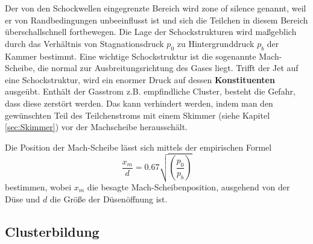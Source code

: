 % 
Der von den Schockwellen eingegrenzte Bereich wird zone of silence genannt, weil er von Randbedingungen unbeeinflusst ist und sich die Teilchen in diesem Bereich überschallschnell fortbewegen.
Die Lage der Schockstrukturen wird maßgeblich durch das Verhältnis von Stagnationsdruck $p_0$ zu Hintergrunddruck $p_b$ der Kammer bestimmt. Eine wichtige Schockstruktur ist die sogenannte Mach-Scheibe, die normal zur Ausbreitungsrichtung des Gases liegt. Trifft der Jet auf eine Schockstruktur, wird ein enormer Druck auf dessen \textbf{Konstituenten} ausgeübt. Enthält der Gasstrom z.B. empfindliche Cluster, besteht die Gefahr, dass diese zerstört werden. Das kann verhindert werden, indem man den gewünschten Teil des Teilchenstroms mit einem Skimmer (siehe Kapitel \ref{sec:Skimmer}) vor der Machscheibe herausschält.

Die Position der Mach-Scheibe lässt sich mittels der empirischen Formel
\begin{equation} \label{eq:Machscheibe}
\frac{x_m}{d}=0.67 \sqrt{\left( \frac{p_0}{p_b}\right)}
\end{equation}
%
bestimmen, wobei $x_m$ die besagte Mach-Scheibenposition, ausgehend von der Düse und $d$ die Größe der Düsenöffnung ist.



\subsection{Clusterbildung}


